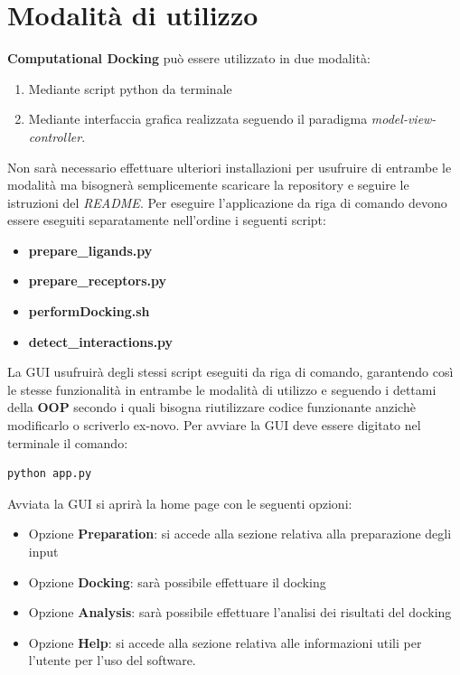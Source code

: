 \section{Modalità di utilizzo}
\textbf{Computational Docking} può essere utilizzato in due modalità:

\begin{enumerate}[label=\arabic{*}., ref=(\arabic{*})]
    \item Mediante script python da terminale
    \item Mediante interfaccia grafica realizzata seguendo il paradigma \textit{model-view-controller}.
\end{enumerate}

Non sarà necessario effettuare ulteriori installazioni per usufruire di entrambe le modalità ma bisognerà semplicemente scaricare la repository e seguire le istruzioni del \textit{README}.\newline
Per eseguire l'applicazione da riga di comando devono essere eseguiti separatamente nell'ordine i seguenti script:

\begin{itemize}
    \item \textbf{prepare\_ligands.py}
    \item \textbf{prepare\_receptors.py}
    \item \textbf{performDocking.sh}
    \item \textbf{detect\_interactions.py}
\end{itemize}

La GUI usufruirà degli stessi script eseguiti da riga di comando, garantendo così le stesse funzionalità in entrambe le modalità di utilizzo e seguendo i dettami della \textbf{OOP} secondo i quali bisogna riutilizzare codice funzionante anzichè modificarlo o scriverlo ex-novo.\newline
Per avviare la GUI deve essere digitato nel terminale il comando:

\begin{lstlisting}[language=bash, label=lst:code2, caption={Comando per avviare la GUI}]
python app.py    
\end{lstlisting}

Avviata la GUI si aprirà la home page con le seguenti opzioni:

\begin{itemize}
    \item Opzione \textbf{Preparation}: si accede alla sezione relativa alla preparazione degli input
    \item Opzione \textbf{Docking}: sarà possibile effettuare il docking
    \item Opzione \textbf{Analysis}: sarà possibile effettuare l'analisi dei risultati del docking
    \item Opzione \textbf{Help}: si accede alla sezione relativa alle informazioni utili per l'utente per l'uso del software.
\end{itemize}

